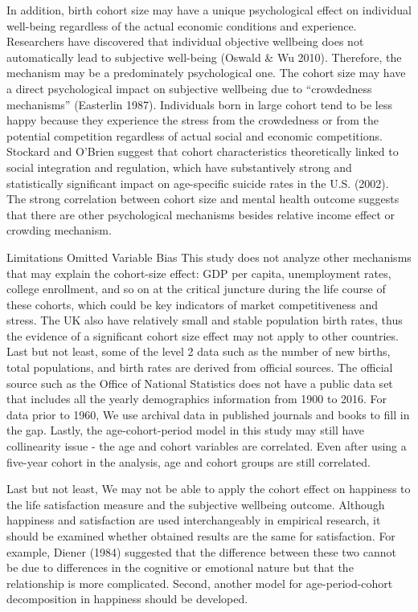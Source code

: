 In addition, birth cohort size may have a unique psychological effect on individual well-being regardless of the actual economic conditions and experience. Researchers have discovered that individual objective wellbeing does not automatically lead to subjective well-being (Oswald & Wu 2010). Therefore, the mechanism may be a predominately psychological one. The cohort size may have a direct psychological impact on subjective wellbeing due to “crowdedness mechanisms” (Easterlin 1987). Individuals born in large cohort tend to be less happy because they experience the stress from the crowdedness or from the potential competition regardless of actual social and economic competitions. Stockard and O’Brien suggest that cohort characteristics theoretically linked to social integration and regulation, which have substantively strong and statistically significant impact on age-specific suicide rates in the U.S. (2002). The strong correlation between cohort size and mental health outcome suggests that there are other psychological mechanisms besides relative income effect or crowding mechanism.

Limitations
Omitted Variable Bias
This study does not analyze other mechanisms that may explain the cohort-size effect: GDP per capita, unemployment rates, college enrollment, and so on at the critical juncture during the life course of these cohorts, which could be key indicators of market competitiveness and stress. The UK also have relatively small and stable population birth rates, thus the evidence of a significant cohort size effect may not apply to other countries. Last but not least, some of the level 2 data such as the number of new births, total populations, and birth rates are derived from official sources. The official source such as the Office of National Statistics does not have a public data set that includes all the yearly demographics information from 1900 to 2016. For data prior to 1960, We use archival data in published journals and books to fill in the gap. Lastly, the age-cohort-period model in this study may still have collinearity issue - the age and cohort variables are correlated. Even after using a five-year cohort in the analysis, age and cohort groups are still correlated.

Last but not least, We may not be able to apply the cohort effect on happiness to the life satisfaction measure and the subjective wellbeing outcome. Although happiness and satisfaction are used interchangeably in empirical research, it should be examined whether obtained results are the same for satisfaction. For example, Diener (1984) suggested that the difference between these two cannot be due to differences in the cognitive or emotional nature but that the relationship is more complicated. Second, another model for age-period-cohort decomposition in happiness should be developed.

